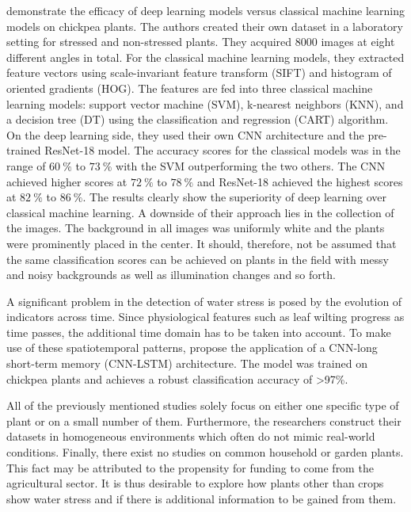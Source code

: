 \documentclass[draft,final]{vutinfth} %
\begin{document}
\textcite{azimi2020} demonstrate the efficacy of deep learning models
versus classical machine learning models on chickpea plants. The
authors created their own dataset in a laboratory setting for stressed
and non-stressed plants. They acquired 8000 images at eight different
angles in total. For the classical machine learning models, they
extracted feature vectors using scale-invariant feature transform
(SIFT) and histogram of oriented gradients (HOG). The features are fed
into three classical machine learning models: support vector machine
(SVM), k-nearest neighbors (KNN), and a decision tree (DT) using the
classification and regression (CART) algorithm. On the deep learning
side, they used their own CNN architecture and the pre-trained
ResNet-18 model. The accuracy scores for the classical models was in
the range of $\qty{60}{\percent}$ to $\qty{73}{\percent}$ with the SVM
outperforming the two others. The CNN achieved higher scores at
$\qty{72}{\percent}$ to $\qty{78}{\percent}$ and ResNet-18 achieved
the highest scores at $\qty{82}{\percent}$ to
$\qty{86}{\percent}$. The results clearly show the superiority of deep
learning over classical machine learning. A downside of their approach
lies in the collection of the images. The background in all images was
uniformly white and the plants were prominently placed in the
center. It should, therefore, not be assumed that the same
classification scores can be achieved on plants in the field with
messy and noisy backgrounds as well as illumination changes and so
forth.

A significant problem in the detection of water stress is posed by the
evolution of indicators across time. Since physiological features such
as leaf wilting progress as time passes, the additional time domain
has to be taken into account. To make use of these spatiotemporal
patterns, \textcite{azimi2021} propose the application of a CNN-long
short-term memory (CNN-LSTM) architecture. The model was trained on
chickpea plants and achieves a robust classification accuracy of
>97\%.

All of the previously mentioned studies solely focus on either one
specific type of plant or on a small number of them. Furthermore, the
researchers construct their datasets in homogeneous environments which
often do not mimic real-world conditions. Finally, there exist no
studies on common household or garden plants. This fact may be
attributed to the propensity for funding to come from the agricultural
sector. It is thus desirable to explore how plants other than crops
show water stress and if there is additional information to be gained
from them.
\end{document}
